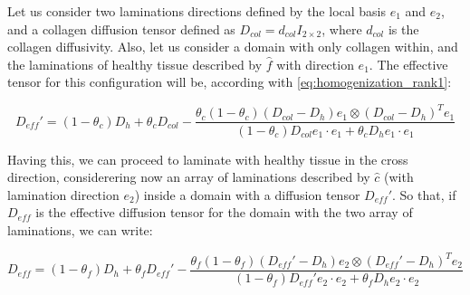Let us consider two laminations directions defined by the local basis $e_1$ and $e_2$, and a collagen diffusion tensor defined as $D_{col} = d_{col} I_{2 \times 2}$, where $d_{col}$ is the collagen diffusivity. Also, let us consider a domain with only collagen within, and the laminations of healthy tissue described by $\hat{f}$ with direction $e_1$. The effective tensor for this configuration will be, according with \ref{eq:homogenization_rank1}:

\begin{equation}
D_{eff}'=
(1 - \theta_c)D_h + \theta_c D_{col} - \frac{\theta_c (1 - \theta_c)(D_{col} - D_{h})e_1 \otimes (D_{col} - D_{h})^T e_1}{(1 - \theta_c)D_{col} e_1 \cdot e_1 + \theta_c D_{h} e_1 \cdot e_1 }
\end{equation}

Having this, we can proceed to laminate with healthy tissue in the cross direction, considerering now an array of laminations described by $\hat{c}$ (with lamination direction $e_2$) inside a domain with a diffusion tensor $D_{eff}'$. So that, if $D_{eff}$ is the effective diffusion tensor for the domain with the two array of laminations, we can write:

\begin{equation}
D_{eff} = 
(1 - \theta_f)D_h + \theta_f D_{eff}' - \frac{\theta_f (1 - \theta_f)(D_{eff}' - D_h)e_2 \otimes (D_{eff}' - D_h)^T e_2}{(1 - \theta_f)D_{eff}' e_2 \cdot e_2 + \theta_f D_h e_2 \cdot e_2 }
\end{equation}